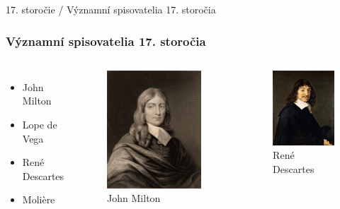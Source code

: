 \documentclass[dvipsnames]{beamer}
\begin{document}
\begin{frame}{\small \textcolor{g}{17. storočie} / \Large Významní spisovatelia 17. storočia}
	\subsubsection{Významní spisovatelia 17. storočia}
	\begin{columns}

	\begin{itemize}
		\item John Milton
		\bigskip
		\item Lope de Vega
		\bigskip
		\item René Descartes
		\bigskip
		\item Molière
	\end{itemize}
	\begin{figure}
		\includegraphics[scale=0.25]{milton}
		\caption{John Milton}
	\end{figure}%
	\begin{figure}
		\includegraphics[scale=0.35]{dekart}
		\caption{René Descartes}
	\end{figure}

	\end{columns}
\end{frame}
\end{document}
